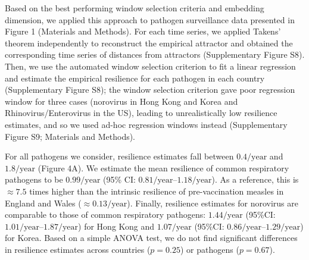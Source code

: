 \documentclass[12pt]{article}
\begin{document}
Based on the best performing window selection criteria and embedding dimension, we applied this approach to pathogen surveillance data presented in Figure 1 (Materials and Methods).
For each time series, we applied Takens' theorem independently to reconstruct the empirical attractor and obtained the corresponding time series of distances from attractors (Supplementary Figure S8).
Then, we use the automated window selection criterion to fit a linear regression and estimate the empirical resilience for each pathogen in each country (Supplementary Figure S8);
the window selection criterion gave poor regression window for three cases (norovirus in Hong Kong and Korea and Rhinovirus/Enterovirus in the US), leading to unrealistically low resilience estimates, and so we used ad-hoc regression windows instead (Supplementary Figure S9; Materials and Methods).

For all pathogens we consider, resilience estimates fall between $0.4/\mathrm{year}$ and $1.8/\mathrm{year}$ (Figure 4A).
We estimate the mean resilience of common respiratory pathogens to be $0.99/\mathrm{year}$ (95\% CI: $0.81/\mathrm{year}$--$1.18/\mathrm{year}$).
As a reference, this is $\approx 7.5$ times higher than the intrinsic resilience of pre-vaccination measles in England and Wales ($\approx 0.13/\mathrm{year}$).
Finally, resilience estimates for norovirus are comparable to those of common respiratory pathogens: $1.44/\mathrm{year}$ (95\%CI: $1.01/\mathrm{year}$--$1.87/\mathrm{year}$) for Hong Kong and $1.07/\mathrm{year}$ (95\%CI: $0.86/\mathrm{year}$--$1.29/\mathrm{year}$) for Korea.
Based on a simple ANOVA test, we do not find significant differences in resilience estimates across countries ($p=0.25$) or pathogens ($p=0.67$).
\end{document}
